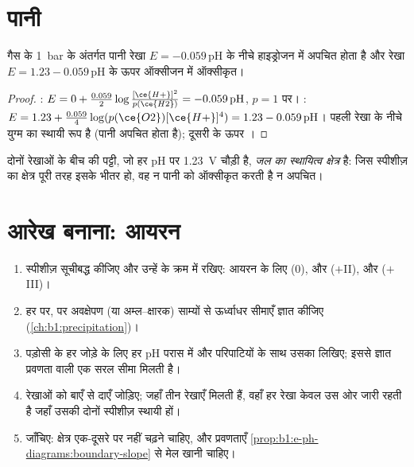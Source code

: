 \section{पानी}

\begin{proposition}[पानी की दो रेखाएँ]\label{prop:b1:e-ph-diagrams:water-lines}
गैस के \qty{1}{bar} के अंतर्गत पानी रेखा
$E = -0.059\,\mathrm{pH}$ के नीचे हाइड्रोजन में अपचित होता है और रेखा $E = 1.23
- 0.059\,\mathrm{pH}$ के ऊपर ऑक्सीजन में ऑक्सीकृत।
\end{proposition}

\begin{proof}
: $E = 0 + \frac{0.059}{2}\log\frac{[\ce{H+}]^2}{p(\ce{H2})}
= -0.059\,\mathrm{pH}$, $p = 1$ पर। : $E = 1.23 +
\frac{0.059}{4}\log(p(\ce{O2})[\ce{H+}]^4) = 1.23 - 0.059\,\mathrm{pH}$। पहली
रेखा के नीचे  युग्म का स्थायी रूप है (पानी
अपचित होता है); दूसरी के ऊपर ।
\end{proof}

\begin{definition}[जल का स्थायित्व क्षेत्र]\label{def:b1:e-ph-diagrams:water-domain}
दोनों रेखाओं के बीच की पट्टी, जो हर pH पर \qty{1.23}{V} चौड़ी है,
\emph{जल का स्थायित्व क्षेत्र} है: जिस
स्पीशीज़ का क्षेत्र पूरी तरह इसके भीतर हो, वह न पानी को ऑक्सीकृत करती है न
अपचित।
\end{definition}

\section{आरेख बनाना: आयरन}

\begin{method}[विभव--pH आरेख बनाना]\label{met:b1:e-ph-diagrams:build}
\begin{enumerate}
  \item स्पीशीज़ सूचीबद्ध कीजिए और उन्हें  के क्रम में रखिए: आयरन के लिए
         (0),  और  ($+$II),  और
         ($+$III)।
  \item हर  पर,  पर अवक्षेपण (या अम्ल--क्षारक) साम्यों से ऊर्ध्वाधर सीमाएँ ज्ञात कीजिए
        (\cref{ch:b1:precipitation})।
  \item पड़ोसी  के हर जोड़े के लिए हर pH परास में
         और परिपाटियों के साथ उसका  लिखिए;
        इससे ज्ञात प्रवणता वाली एक सरल सीमा मिलती है।
  \item रेखाओं को बाएँ से दाएँ जोड़िए; जहाँ तीन रेखाएँ मिलती हैं,
        वहाँ हर रेखा केवल उस ओर जारी रहती है जहाँ उसकी दोनों स्पीशीज़
        स्थायी हों।
  \item जाँचिए: क्षेत्र एक-दूसरे पर नहीं चढ़ने चाहिए, और प्रवणताएँ
        \cref{prop:b1:e-ph-diagrams:boundary-slope} से मेल खानी चाहिए।
\end{enumerate}
\end{method}

